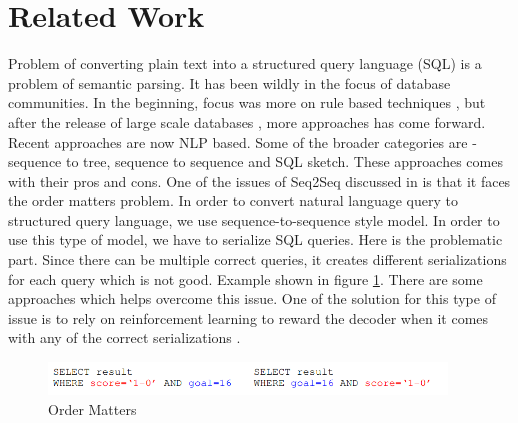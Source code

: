 \documentclass[12pt]{article}
\begin{document}
\newpage

\section{Related Work}

Problem of converting plain text into a structured query language (SQL) is a problem of semantic parsing. It has been wildly in the focus of database communities. In the beginning, focus was more on rule based techniques \cite{setlur2016eviza}, but after the release of large scale databases \cite{yu2018spider} \cite{zhong2017seq2sql}, more approaches has come forward. Recent approaches are now NLP based. Some of the broader categories are - sequence to tree, sequence to sequence and SQL sketch. These approaches comes with their pros and cons. One of the issues of Seq2Seq discussed in \cite{xu2017sqlnet} is that it faces the order matters problem. In order to convert natural language query to
structured query language, we use sequence-to-sequence style model. In order to use this type of model, we have to serialize SQL queries. Here is the problematic part. Since there can be multiple correct queries, it creates different serializations for each query which is not good. Example shown in figure \ref{fig:Order Matters}. There are some approaches which helps overcome this issue. One of the solution for this type of issue is to rely on reinforcement learning to reward the decoder when it comes with any of the correct serializations \cite{xu2017sqlnet}. 


\begin{figure}[H]
    \includegraphics[width=300pt]{OrderMatters}
    \caption{Order Matters}
    \label{fig:Order Matters}
\end{figure}
\end{document}
